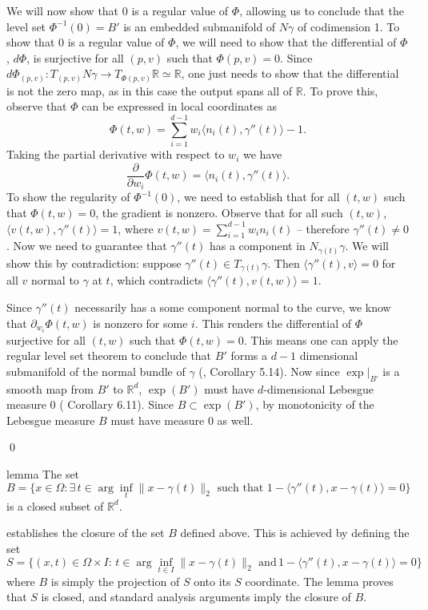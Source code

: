 \documentclass[11pt]{article}
\begin{document}
We will now show that $0$ is a regular value of $\Phi$, allowing us to conclude that the level set $\Phi^{-1}(0) = B'$ is an embedded submanifold of $N\gamma$ of codimension 1. To show that $0$ is a regular value of $\Phi$, we will need to show that the differential of $\Phi$, $d\Phi$, is surjective for all $(p,v)$ such that $\Phi(p,v) = 0$. Since $d\Phi_{(p,v)}: T_{(p,v)}N\gamma \rightarrow T_{\Phi(p,v)}\mathbb{R} \simeq\mathbb{R}$, one just needs to show that the differential is not the zero map, as in this case the output spans all of $\mathbb{R}$. To prove this, observe that $\Phi$ can be expressed in local coordinates as
\[\Phi(t,w) = \sum_{i = 1}^{d-1}w_i\langle n_i(t), \gamma''(t)\rangle - 1.\]
Taking the partial derivative with respect to $w_i$ we have
\[\frac{\partial}{\partial w_i}\Phi(t,w) = \langle n_i(t), \gamma''(t)\rangle.\]
To show the regularity of $\Phi^{-1}(0)$, we need to establish that for all $(t,w)$ such that $\Phi(t,w) = 0$, the gradient is nonzero. Observe that for all such $(t,w)$, $\langle v(t,w), \gamma''(t)\rangle = 1$, where $v(t,w) = \sum_{i = 1}^{d-1}w_in_{i}(t)$ -- therefore $\gamma''(t) \neq 0$. Now we need to guarantee that $\gamma''(t)$ has a component in $N_{\gamma(t)}\gamma$. We will show this by contradiction: suppose $\gamma''(t) \in T_{\gamma(t)}\gamma$. Then $\langle\gamma''(t), v\rangle = 0$ for all $v$ normal to $\gamma$ at $t$, which contradicts $\langle \gamma''(t), v(t,w) \rangle = 1$.

Since $\gamma''(t)$ necessarily has a some component normal to the curve, we know that $\partial_{w_i}\Phi(t,w)$ is nonzero for some $i$. This renders the differential of $\Phi$ surjective for all $(t,w)$ such that $\Phi(t,w) = 0$. This means one can apply the regular level set theorem to conclude that $B'$ forms a $d-1$ dimensional submanifold of the normal bundle of $\gamma$ (\citet{lee2003smooth}, Corollary 5.14). Now since $\exp\big|_{B'}$ is a smooth map from $B'$ to $\mathbb{R}^d$, $\exp(B')$ must have $d$-dimensional Lebesgue measure $0$ (\citet{lee2003smooth} Corollary 6.11). Since $B \subset \exp(B')$, by monotonicity of the Lebesgue measure $B$ must have measure $0$ as well.

\qed{}



\begin{restatable}{lemma}{} \label{lemma: IFT degen closed}
    The set 
    \begin{equation}
    B= \{x \in \Omega : \exists \,t \in \arg\inf_t \|x-\gamma(t)\|_2 \text{ such that } 1 - \langle\gamma''(t), x-\gamma(t)\rangle = 0 \}
    \end{equation}
    is a closed subset of $\mathbb{R}^d$. 
\end{restatable}
\noindent {} establishes the closure of the set $B$ defined above. This is achieved by defining the set 
\[S= \{(x,t) \in \Omega\times I : \, t \in \arg\inf_{t\in I}\|x-\gamma(t)\|_2 \text{ and} \, 1 - \langle\gamma''(t), x - \gamma(t)\rangle = 0\} \]
where $B$ is simply the projection of $S$ onto its $S$ coordinate. The lemma proves that $S$ is closed, and standard analysis arguments imply the closure of $B$.  
\end{document}
